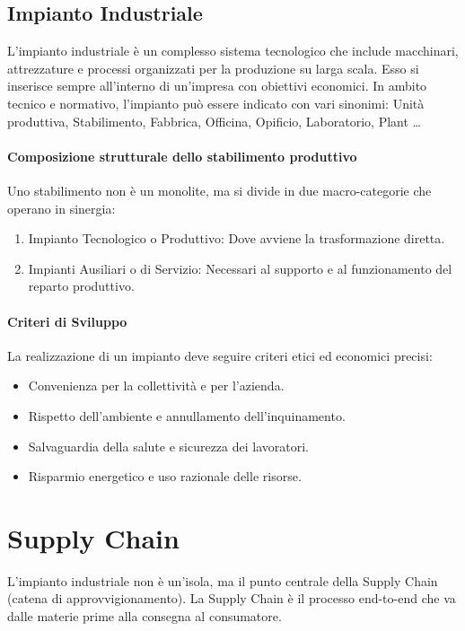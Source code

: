 \subsection{Impianto Industriale}
L'impianto industriale è un complesso sistema tecnologico che include macchinari, attrezzature e processi organizzati per la produzione su larga scala. Esso si inserisce sempre all'interno di un'impresa con obiettivi economici.
In ambito tecnico e normativo, l'impianto può essere indicato con vari sinonimi: Unità produttiva, Stabilimento, Fabbrica, Officina, Opificio, Laboratorio, Plant \dots
%
\paragraph{Composizione strutturale dello stabilimento produttivo} Uno stabilimento non è un monolite, ma si divide in due macro-categorie che operano in sinergia:
\begin{enumerate}
    \item Impianto Tecnologico o Produttivo: Dove avviene la trasformazione diretta.
    \item Impianti Ausiliari o di Servizio: Necessari al supporto e al funzionamento del reparto produttivo.
\end{enumerate}
%
\paragraph{Criteri di Sviluppo} La realizzazione di un impianto deve seguire criteri etici ed economici precisi:
\begin{itemize}
    \item Convenienza per la collettività e per l'azienda.
    \item Rispetto dell'ambiente e annullamento dell'inquinamento.
    \item Salvaguardia della salute e sicurezza dei lavoratori.
    \item Risparmio energetico e uso razionale delle risorse.
\end{itemize}
%
\section{Supply Chain}
L'impianto industriale non è un'isola, ma il punto centrale della Supply Chain (catena di approvvigionamento). La Supply Chain è il processo end-to-end che va dalle materie prime alla consegna al consumatore.
%
